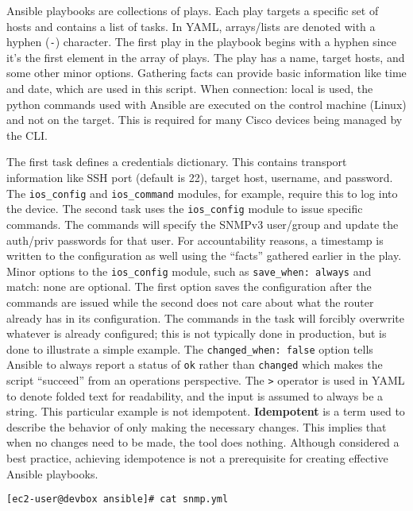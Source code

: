 Ansible playbooks are collections of plays. Each play targets a specific set
of hosts and contains a list of tasks. In YAML, arrays/lists are denoted with
a hyphen (\verb|-|) character. The first play in the playbook begins with a hyphen
since it’s the first element in the array of plays. The play has a name,
target hosts, and some other minor options. Gathering facts can provide basic
information like time and date, which are used in this script. When
connection: local is used, the python commands used with Ansible are executed
on the control machine (Linux) and not on the target. This is required for
many Cisco devices being managed by the CLI\@.

The first task defines a credentials dictionary. This contains transport
information like SSH port (default is 22), target host, username, and
password. The \verb|ios_config| and \verb|ios_command| modules, for example,
require this to log into the device. The second task uses the
\verb|ios_config| module to issue specific commands. The commands will specify
the SNMPv3 user/group and update the auth/priv passwords for that user. For
accountability reasons, a timestamp is written to the configuration as well
using the ``facts'' gathered earlier in the play. Minor options to the
\verb|ios_config| module, such as \verb|save_when: always| and match: none are
optional. The first option saves the configuration after the commands are
issued while the second does not care about what the router already has in its
configuration. The commands in the task will forcibly overwrite whatever is
already configured; this is not typically done in production, but is done to
illustrate a simple example. The \verb|changed_when: false| option tells
Ansible to always report a status of \verb|ok| rather than \verb|changed|
which makes the script ``succeed'' from an operations perspective. The \verb|>|
operator is used in YAML to denote folded text for readability, and the input
is assumed to always be a string. This particular example is not idempotent.
\textbf{Idempotent} is a term used to describe the behavior of only making the
necessary changes. This implies that when no changes need to be made, the tool
does nothing. Although considered a best practice, achieving idempotence is
not a prerequisite for creating effective Ansible playbooks.

\begin{verbatim}
[ec2-user@devbox ansible]# cat snmp.yml 
\end{verbatim}

